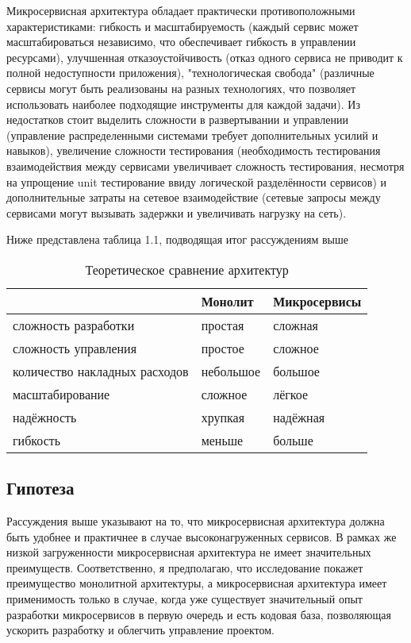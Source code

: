     Микросервисная архитектура обладает практически противоположными характеристиками: гибкость и масштабируемость (каждый сервис может масштабироваться независимо, что обеспечивает гибкость в управлении ресурсами), улучшенная отказоустойчивость (отказ одного сервиса не приводит к полной недоступности приложения), "технологическая свобода" (различные сервисы могут быть реализованы на разных технологиях, что позволяет использовать наиболее подходящие инструменты для каждой задачи). Из недостатков стоит выделить сложности в развертывании и управлении (управление распределенными системами требует дополнительных усилий и навыков), увеличение сложности тестирования (необходимость тестирования взаимодействия между сервисами увеличивает сложность тестирования, несмотря на упрощение unit тестирование ввиду логической разделённости сервисов) и дополнительные затраты на сетевое взаимодействие (сетевые запросы между сервисами могут вызывать задержки и увеличивать нагрузку на сеть).

    Ниже представлена таблица 1.1, подводящая итог рассуждениям выше

    \begin{table}
        \centering
        \begin{tabular}{ p{3cm} p{5cm} p{5cm} }
             & Монолит & Микросервисы \\ \hline
            сложность разработки & простая & сложная \\ \hline
            сложность управления & простое & сложное \\ \hline
            количество накладных расходов & небольшое & большое \\ \hline
            масштабирование & сложное & лёгкое \\ \hline
            надёжность & хрупкая & надёжная \\ \hline
            гибкость & меньше & больше \\
        \end{tabular}
        \caption{Теоретическое сравнение архитектур}
        \label{tab:my_label}
    \end{table}

\subsection{Гипотеза}
    Рассуждения выше указывают на то, что микросервисная архитектура должна быть удобнее и практичнее в случае высоконагруженных сервисов. В рамках же низкой загруженности микросервисная архитектура не имеет значительных преимуществ. Соответственно, я предполагаю, что исследование покажет преимущество монолитной архитектуры, а микросервисная архитектура имеет применимость только в случае, когда уже существует значительный опыт разработки микросервисов в первую очередь и есть кодовая база, позволяющая ускорить разработку и облегчить управление проектом.
        
\clearpage
